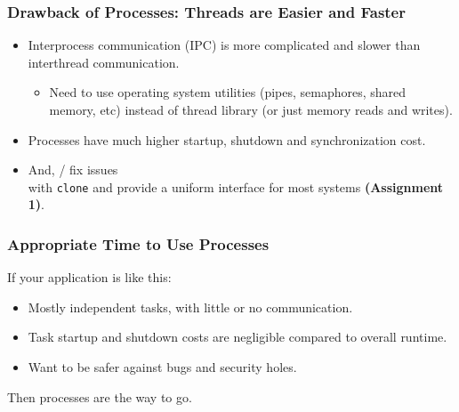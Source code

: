 \begin{frame}[fragile]
  \frametitle{Drawback of Processes: Threads are Easier and Faster}

  \begin{itemize}
    \item Interprocess communication (IPC) is more complicated and slower than interthread
          communication.
      \begin{itemize}
        \item Need to use operating system utilities (pipes, semaphores, shared
              memory, etc) instead of thread library (or just memory reads and writes).
      \end{itemize}
    \item Processes have much higher startup, shutdown and synchronization cost.
    \item And, / fix issues\\ with {\tt clone} and provide a
          uniform interface for most systems {\bf (Assignment 1)}.
  \end{itemize}

\end{frame}

\begin{frame}[fragile]
  \frametitle{Appropriate Time to Use Processes}


  If your application is like this:
  \begin{itemize}
    \item Mostly independent tasks, with little or no communication.
    \item Task startup and shutdown costs are negligible compared to overall runtime.
    \item Want to be safer against bugs and security holes.
  \end{itemize}
  Then processes are the way to go. \\[1em]


\end{frame}

